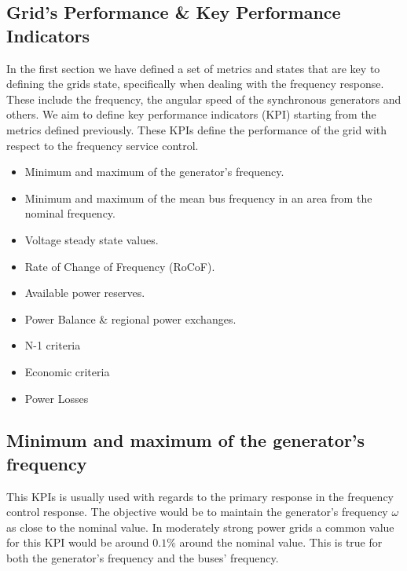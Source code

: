 \documentclass{article}
\begin{document}
\subsection{Grid's Performance \& Key Performance Indicators}

In the first section we have defined a set of metrics and states that are key to defining the grids state, specifically when dealing with the frequency response. These include the frequency, the angular speed of the synchronous generators and others. We aim to define key performance indicators (KPI) starting from the metrics defined previously. These KPIs define the performance of the grid with respect to the frequency service control. 

\begin{itemize}
    \item Minimum and maximum of the generator's frequency.
    \item Minimum and maximum of the mean bus frequency in an area from the nominal frequency.
    \item Voltage steady state values.
    \item Rate of Change of Frequency (RoCoF).
    \item Available power reserves.
    \item Power Balance \& regional power exchanges.
    \item N-1 criteria
    \item Economic criteria
    \item Power Losses
\end{itemize}





\subsection*{Minimum and maximum of the generator's frequency}

This KPIs is usually used with regards to the primary response in the frequency control response. The objective would be to maintain the generator's frequency $\omega$ as close to the nominal value. In moderately strong power grids a common value for this KPI would be around $0.1\%$ around the nominal value. This is true for both the generator's frequency and the buses' frequency.
\end{document}
